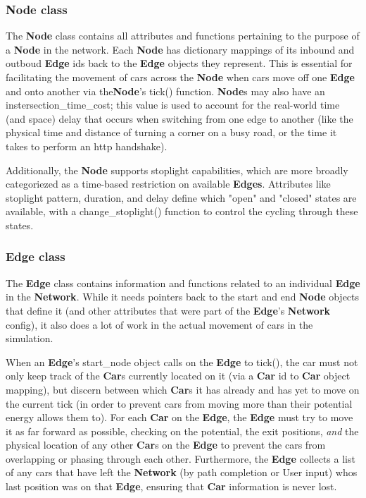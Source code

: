 \subsubsection{Node class}

\par The \textbf{Node} class contains all attributes and functions pertaining to the purpose of a \textbf{Node} in the network.  Each \textbf{Node} has dictionary mappings of its inbound and outboud \textbf{Edge} ids back to the \textbf{Edge} objects they represent.  This is essential for facilitating the movement of cars across the \textbf{Node} when cars move off one \textbf{Edge} and onto another via the\textbf{Node}'s tick() function. \textbf{Node}s may also have an instersection\_time\_cost; this value is used to account for the real-world time (and space) delay that occurs when switching from one edge to another (like the physical time and distance of turning a corner on a busy road, or the time it takes to perform an http handshake). \\

\par  Additionally, the \textbf{Node} supports stoplight capabilities, which are more broadly categoriezed as a time-based restriction on available \textbf{Edges}.  Attributes like stoplight pattern, duration, and delay define which "open" and "closed" states are available, with a change\_stoplight() function to control the cycling through these states. \\

\subsubsection{Edge class}

\par The \textbf{Edge} class contains information and functions related to an individual \textbf{Edge} in the \textbf{Network}.  While it needs pointers back to the start and end \textbf{Node} objects that define it (and other attributes that were part of the \textbf{Edge}'s \textbf{Network} config), it also does a lot of work in the actual movement of cars in the simulation. \\

\par When an \textbf{Edge}'s start\_node object calls on the \textbf{Edge} to tick(), the car must not only keep track of the \textbf{Car}s currently located on it (via a \textbf{Car} id to \textbf{Car} object mapping), but discern between which \textbf{Car}s it has already and has yet to move on the current tick (in order to prevent cars from moving more than their potential energy allows them to).  For each \textbf{Car} on the \textbf{Edge}, the \textbf{Edge} must try to move it as far forward as possible, checking on the potential, the exit positions, \textit{and} the physical location of any other \textbf{Car}s on the \textbf{Edge} to prevent the cars from overlapping or phasing through each other. Furthermore, the \textbf{Edge} collects a list of any cars that have left the \textbf{Network} (by path completion or User input) whos last position was on that \textbf{Edge}, ensuring that \textbf{Car} information is never lost.\\


